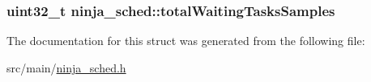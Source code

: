 \hypertarget{structninja__sched_a235aba2548221dbf76f7037515806aa3}{
\subsubsection[{total\+Waiting\+Tasks\+Samples}]{\setlength{\rightskip}{0pt plus 5cm}uint32\+\_\+t ninja\+\_\+sched\+::total\+Waiting\+Tasks\+Samples}}\label{structninja__sched_a235aba2548221dbf76f7037515806aa3}


The documentation for this struct was generated from the following file\+:\begin{DoxyCompactItemize}
\item 
src/main/\hyperlink{ninja__sched_8h}{ninja\+\_\+sched.\+h}\end{DoxyCompactItemize}
